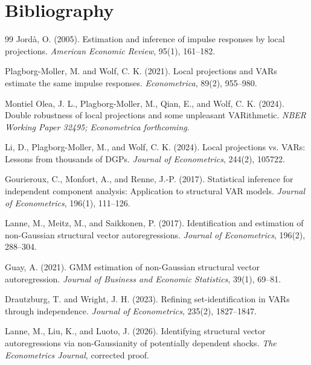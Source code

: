 \documentclass[11pt]{article}
\theoremstyle{definition}
\theoremstyle{plain}
\theoremstyle{remark}
\begin{document}
\section*{Bibliography}
\begin{thebibliography}{99}
Jord\`a, O. (2005).
Estimation and inference of impulse responses by local projections.
\emph{American Economic Review}, 95(1), 161--182.

Plagborg-Moller, M. and Wolf, C. K. (2021).
Local projections and VARs estimate the same impulse responses.
\emph{Econometrica}, 89(2), 955--980.

Montiel Olea, J. L., Plagborg-Moller, M., Qian, E., and Wolf, C. K. (2024).
Double robustness of local projections and some unpleasant VARithmetic.
\emph{NBER Working Paper 32495; Econometrica forthcoming}.

Li, D., Plagborg-Moller, M., and Wolf, C. K. (2024).
Local projections vs. VARs: Lessons from thousands of DGPs.
\emph{Journal of Econometrics}, 244(2), 105722.

Gourieroux, C., Monfort, A., and Renne, J.-P. (2017).
Statistical inference for independent component analysis: Application to structural VAR models.
\emph{Journal of Econometrics}, 196(1), 111--126.

Lanne, M., Meitz, M., and Saikkonen, P. (2017).
Identification and estimation of non-Gaussian structural vector autoregressions.
\emph{Journal of Econometrics}, 196(2), 288--304.

Guay, A. (2021).
GMM estimation of non-Gaussian structural vector autoregression.
\emph{Journal of Business and Economic Statistics}, 39(1), 69--81.

Drautzburg, T. and Wright, J. H. (2023).
Refining set-identification in VARs through independence.
\emph{Journal of Econometrics}, 235(2), 1827--1847.

Lanne, M., Liu, K., and Luoto, J. (2026).
Identifying structural vector autoregressions via non-Gaussianity of potentially dependent shocks.
\emph{The Econometrics Journal}, corrected proof.
\end{thebibliography}
\end{document}
